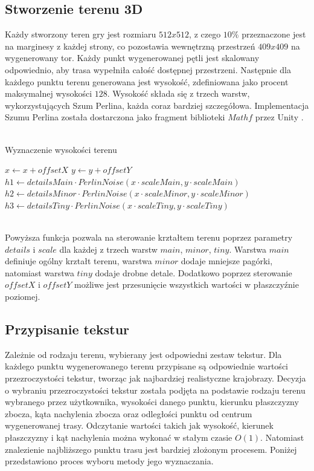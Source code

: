 \subsection{Stworzenie terenu 3D}
Każdy stworzony teren gry jest rozmiaru $512 x 512$, z czego $10\%$ przeznaczone jest na marginesy z każdej strony, co pozostawia wewnętrzną przestrzeń $409 x 409$ na wygenerowany tor. Każdy punkt wygenerowanej pętli jest skalowany odpowiednio, aby trasa wypełniła całość dostępnej przestrzeni. Następnie dla każdego punktu terenu generowana jest wysokość, zdefiniowana jako procent maksymalnej wysokości $128$. Wysokość składa się z trzech warstw, wykorzystujących Szum Perlina, każda coraz bardziej szczegółowa. Implementacja Szumu Perlina została dostarczona jako fragment biblioteki $Mathf$ przez Unity \cite{PerlinNoise}.
\\\\
\begin{algorithm}[H]
    \caption{Wyznaczenie wysokości terenu}\label{alg}
    $x \gets x + offsetX$\;
    $y \gets y + offsetY$\;
    $h1 \gets detailsMain \cdot PerlinNoise(x \cdot scaleMain, y \cdot scaleMain)$\;
    $h2 \gets detailsMinor \cdot PerlinNoise(x \cdot scaleMinor, y \cdot scaleMinor)$\;
    $h3 \gets detailsTiny \cdot PerlinNoise(x \cdot scaleTiny, y \cdot scaleTiny)$\;
\end{algorithm}
\phantom{.}\\
Powyższa funkcja pozwala na sterowanie krztałtem terenu poprzez parametry $details$ i $scale$ dla każdej z trzech warstw $main$, $minor$, $tiny$. Warstwa $main$ definiuje ogólny krztałt terenu, warstwa $minor$ dodaje mniejsze pagórki, natomiast warstwa $tiny$ dodaje drobne detale. Dodatkowo poprzez sterowanie $offsetX$ i $offsetY$ możliwe jest przesunięcie wszystkich wartości w płaszczyźnie poziomej.

\subsection{Przypisanie tekstur}
Zależnie od rodzaju terenu, wybierany jest odpowiedni zestaw tekstur. Dla każdego punktu wygenerowanego terenu przypisane są odpowiednie wartości przezroczystości tekstur, tworząc jak najbardziej realistyczne krajobrazy. Decyzja o wybraniu przezroczystości tekstur została podjęta na podstawie rodzaju terenu wybranego przez użytkownika, wysokości danego punktu, kierunku płaszczyzny zbocza, kąta nachylenia zbocza oraz odległości punktu od centrum wygenerowanej trasy. Odczytanie wartości takich jak wysokość, kierunek płaszczyzny i kąt nachylenia można wykonać w stałym czasie $O(1)$. Natomiast znalezienie najbliższego punktu trasu jest bardziej złożonym procesem. Poniżej przedstawiono proces wyboru metody jego wyznaczania.

